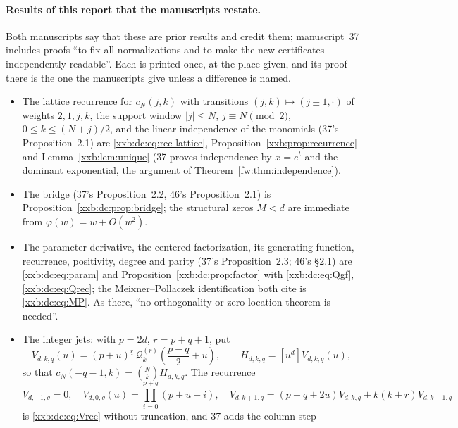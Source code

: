 \documentclass[11pt,a4paper]{article}
\numberwithin{equation}{section}
\theoremstyle{definition}
\theoremstyle{remark}
\theoremstyle{plain}
\newcommand{\fall}[2]{#1^{\underline{#2}}}
\begin{document}
\paragraph{Results of this report that the manuscripts restate.}  Both
manuscripts say that these are prior results and credit them; manuscript~37
includes proofs ``to fix all normalizations and to make the new certificates
independently readable''.  Each is printed once, at the place given, and its
proof there is the one the manuscripts give unless a difference is named.
\begin{itemize}[leftmargin=1.4em,itemsep=1pt]
\item The lattice recurrence for $c_N(j,k)$ with transitions
 $(j,k)\mapsto(j\pm1,\cdot)$ of weights $2,1,j,k$, the support window
 $|j|\le N$, $j\equiv N\pmod 2$, $0\le k\le(N+j)/2$, and the linear
 independence of the monomials (37's Proposition~2.1) are
 \eqref{xxb:dc:eq:rec-lattice}, Proposition~\ref{xxb:prop:recurrence} and
 Lemma~\ref{xxb:lem:unique} (37 proves independence by $x=e^t$ and the
 dominant exponential, the argument of Theorem~\ref{fw:thm:independence}).
\item The bridge (37's Proposition~2.2, 46's Proposition~2.1) is
 Proposition~\ref{xxb:dc:prop:bridge}; the structural zeros $M<d$ are
 immediate from $\varphi(w)=w+O(w^2)$.
\item The parameter derivative, the centered factorization, its generating
 function, recurrence, positivity, degree and parity (37's
 Proposition~2.3; 46's \S2.1) are \eqref{xxb:dc:eq:param} and
 Proposition~\ref{xxb:dc:prop:factor} with \eqref{xxb:dc:eq:Qgf},
 \eqref{xxb:dc:eq:Qrec}; the Meixner--Pollaczek identification both cite
 \cite[Eq.~18.23.7]{xxbdc-dlmf} is \eqref{xxb:dc:eq:MP}.  As there, ``no
 orthogonality or zero-location theorem is needed''.
\item The integer jets: with $p=2d$, $r=p+q+1$, put
\begin{equation}\label{xxb:d78:eq:V}
 V_{d,k,q}(u)=\fall{(p+u)}{r}\,\mathcal Q_k^{(r)}\!\left(\frac{p-q}{2}+u\right),
 \qquad H_{d,k,q}=[u^d]V_{d,k,q}(u),
\end{equation}
 so that $c_N(-q-1,k)=\binom NkH_{d,k,q}$.  The recurrence
\begin{equation}\label{xxb:d78:eq:Frec}
 V_{d,-1,q}=0,\quad
 V_{d,0,q}(u)=\prod_{i=0}^{p+q}(p+u-i),\quad
 V_{d,k+1,q}=(p-q+2u)V_{d,k,q}+k(k+r)V_{d,k-1,q}
\end{equation}
 is \eqref{xxb:dc:eq:Vrec} without truncation, and 37 adds the column step
\begin{equation}\label{xxb:d78:eq:qrec}

\end{equation}
\end{itemize}
\end{document}
